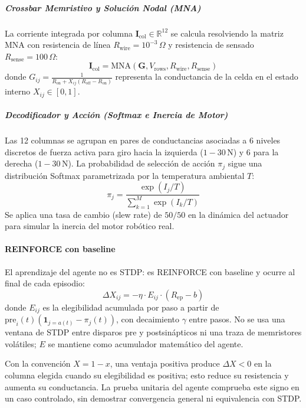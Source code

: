 \subparagraph{Crossbar Memristivo y Solución Nodal (MNA)}
La corriente integrada por columna $\mathbf{I}_{\text{col}} \in \mathbb{R}^{12}$ se calcula resolviendo la matriz MNA con resistencia de línea $R_{\text{wire}} = 10^{-3}\,\Omega$ y resistencia de sensado $R_{\text{sense}} = 100\,\Omega$:
\begin{equation}
    \mathbf{I}_{\text{col}} = \text{MNA}(\mathbf{G}, V_{\text{rows}}, R_{\text{wire}}, R_{\text{sense}})
\end{equation}
donde $G_{ij} = \frac{1}{R_{\text{on}} + X_{ij}(R_{\text{off}} - R_{\text{on}})}$ representa la conductancia de la celda en el estado interno $X_{ij} \in [0, 1]$.

\subparagraph{Decodificador y Acción (Softmax e Inercia de Motor)}
Las 12 columnas se agrupan en pares de conductancias asociadas a 6 niveles discretos de fuerza activa para giro hacia la izquierda ($1 - 30\,\text{N}$) y 6 para la derecha ($1 - 30\,\text{N}$). La probabilidad de selección de acción $\pi_j$ sigue una distribución Softmax parametrizada por la temperatura ambiental $T$:
\begin{equation}
    \pi_j = \frac{\exp(I_j / T)}{\sum_{k=1}^M \exp(I_k / T)}
\end{equation}
Se aplica una tasa de cambio (slew rate) de $50/50$ en la dinámica del actuador para simular la inercia del motor robótico real.

\paragraph{REINFORCE con baseline}
El aprendizaje del agente no es STDP: es REINFORCE con baseline y ocurre al final de cada episodio:
\begin{equation}
    \Delta X_{ij} = -\eta \cdot E_{ij} \cdot (R_{\text{ep}} - b)
\end{equation}
donde $E_{ij}$ es la elegibilidad acumulada por paso a partir de $\mathrm{pre}_i(t)(\mathbf{1}_{j=a(t)}-\pi_j(t))$, con decaimiento $\gamma$ entre pasos. No se usa una ventana de STDP entre disparos pre y postsinápticos ni una traza de memristores volátiles; $E$ se mantiene como acumulador matemático del agente.

Con la convención $X=1-x$, una ventaja positiva produce
$\Delta X<0$ en la columna elegida cuando su elegibilidad es positiva;
esto reduce su resistencia y aumenta su conductancia. La prueba
unitaria del agente comprueba este signo en un caso controlado, sin
demostrar convergencia general ni equivalencia con STDP.

